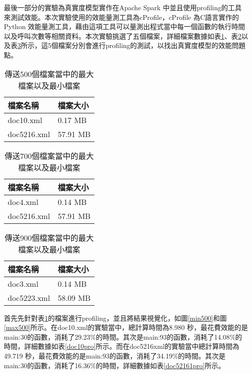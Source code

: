 最後一部分的實驗為真實度模型實作在Apache Spark 中並且使用profiling的工具來測試效能。本次實驗使用的效能量測工具為cProfile\cite{prof}，cProfile 為C語言實作的Python 效能量測工具，藉由這項工具可以量測出程式當中每一個函數的執行時間以及呼叫次數等相關資料。本次實驗挑選了五個檔案，詳細檔案數據如表\ref{500maxmin}、表\ref{700maxmin}以及表\ref{900maxmin}所示，這5個檔案分別會進行profiling的測試，以找出真實度模型的效能問題點。

\begin{table}[H]
\caption{傳送500個檔案當中的最大檔案以及最小檔案}
\label{500maxmin}
\begin{center}
\begin{tabular}{|p{3cm}<{\centering}|p{3cm}<{\centering}|}
\hline
檔案名稱 & 檔案大小\\
\hline
doc10.xml & 0.17 MB \\
\hline
doc5216.xml & 57.91 MB \\
\hline
\end{tabular}
\end{center}
\end{table}

\begin{table}[H]
\caption{傳送700個檔案當中的最大檔案以及最小檔案}
\label{700maxmin}
\begin{center}
\begin{tabular}{|p{3cm}<{\centering}|p{3cm}<{\centering}|}
\hline
檔案名稱 & 檔案大小\\
\hline
doc4.xml & 0.14 MB \\
\hline
doc5216.xml & 57.91 MB \\
\hline
\end{tabular}
\end{center}
\end{table}

\begin{table}[H]
\caption{傳送900個檔案當中的最大檔案以及最小檔案}
\label{900maxmin}
\begin{center}
\begin{tabular}{|p{3cm}<{\centering}|p{3cm}<{\centering}|}
\hline
檔案名稱 & 檔案大小\\
\hline
doc3.xml & 0.14 MB \\
\hline
doc5223.xml & 58.09 MB \\
\hline
\end{tabular}
\end{center}
\end{table}
首先先針對表\ref{500maxmin}的檔案進行profiling，並且將結果視覺化，如圖\ref{min500}和圖\ref{max500}所示。在doc10.xml的實驗當中，總計算時間為8.980 秒，最花費效能的是main:30的函數，消耗了29.23\%的時間。其次是main:93的函數，消耗了14.08\%的時間，詳細數據如表\ref{doc10pro}所示。而在doc5216xml的實驗當中總計算時間為49.719 秒，最花費效能的是main:93的函數，消耗了34.19\%的時間。其次是main:30的函數，消耗了16.36\%的時間，詳細數據如表\ref{doc52161pro}所示。

